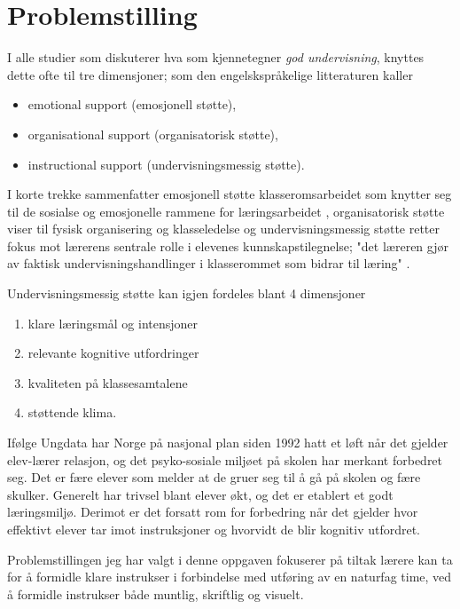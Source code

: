 \documentclass[main.tex]{subfiles}
\begin{document}
\section{Problemstilling}    
I alle studier som diskuterer hva som kjennetegner \emph{god undervisning}, knyttes 
dette ofte til tre dimensjoner\cite[Klette 2013, side 142]{klette}; som den 
engelskspråkelige litteraturen kaller 
\begin{itemize}
\item emotional support (emosjonell støtte),
\item organisational support (organisatorisk støtte),
\item instructional support (undervisningsmessig støtte).
\end{itemize}
I korte trekke sammenfatter emosjonell støtte klasseromsarbeidet som knytter
seg til de sosialse og emosjonelle rammene for læringsarbeidet \cite[Klette 2013, side 143]{klette},
organisatorisk støtte viser til fysisk organisering og klasseledelse \cite[Klette 2013, side189]{klette}
og undervisningsmessig støtte retter fokus mot lærerens sentrale rolle i elevenes kunnskapstilegnelse; "det 
læreren gjør av faktisk undervisningshandlinger i klasserommet som bidrar til læring" 
\cite[Klette 2013, side 143 og 146]{klette}.
\newline

Undervisningsmessig støtte kan igjen fordeles blant 4 dimensjoner\cite[Klette 2013, side 146]{klette}
\begin{enumerate}
\item klare læringsmål og intensjoner
\item relevante kognitive utfordringer
\item kvaliteten på klassesamtalene
\item støttende klima.
\end{enumerate}

Ifølge Ungdata\cite{ungdata}\cite[Klette, side 144]{klette} har Norge på nasjonal 
plan siden 1992 hatt et løft når det gjelder elev-lærer 
relasjon, og det psyko-sosiale miljøet på skolen har merkant 
forbedret seg. Det er fære elever som melder at de gruer seg til å 
gå på skolen og fære skulker. Generelt har trivsel 
blant elever økt, og det er etablert et godt læringsmiljø. Derimot er det 
forsatt rom for forbedring når det gjelder hvor effektivt elever tar imot 
instruksjoner og hvorvidt de blir kognitiv utfordret. 
\newline

Problemstillingen jeg har valgt i denne oppgaven fokuserer på tiltak lærere kan ta for å
formidle klare instrukser i forbindelse med utføring av en naturfag time, ved å formidle instrukser 
både muntlig, skriftlig og visuelt.
\newline
\end{document}
